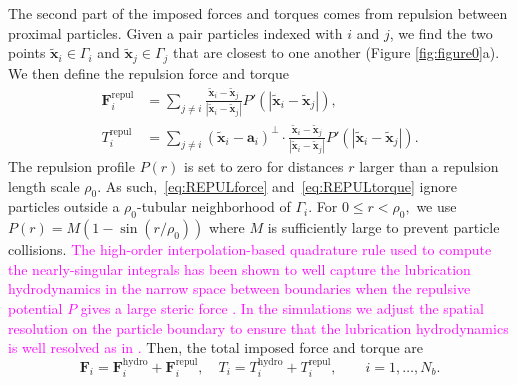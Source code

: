 \documentclass[lineno]{jfm}
\renewcommand{\aa}{\mathbf{a}}
\newcommand{\FF}{\mathbf{F}}
\newcommand{\xx}{\mathbf{x}}
\begin{document}
The second part of the imposed forces and torques comes from repulsion
between proximal particles. Given a pair particles indexed with $i$ and
$j$, we find the two points $\tilde{\xx}_i \in \Gamma_i$ and
$\tilde{\xx}_j \in \Gamma_j$ that are closest to one another (Figure \ref{fig:figure0}a). We then
define the repulsion force and torque
\begin{align}
  \label{eq:REPULforce}
  \FF_i^{\text{repul}} &= \sum_{j \neq i} 
    \frac{\tilde{\xx}_i - \tilde{\xx}_j}
    {|\tilde{\xx}_i - \tilde{\xx}_j|} 
    P'(|\tilde{\xx}_i - \tilde{\xx}_j|), \\
  \label{eq:REPULtorque}
  T_i^{\text{repul}} &= \sum_{j \neq i} 
    (\tilde{\xx}_i - \aa_i)^{\perp} \cdot 
    \frac{\tilde{\xx}_i - \tilde{\xx}_j}
    {|\tilde{\xx}_i - \tilde{\xx}_j|} 
    P'(|\tilde{\xx}_i - \tilde{\xx}_j|).
\end{align}
The repulsion profile $P(r)$ is set to zero for distances $r$ larger than a
repulsion length scale $\rho_0$. As such,~\eqref{eq:REPULforce}
and~\eqref{eq:REPULtorque} ignore particles outside a
$\rho_0$-tubular neighborhood of $\Gamma_i$. For $0 \leq r < \rho_0,$ we use
$P(r) = M(1 - \sin(r/\rho_0))$ where $M$ is sufficiently large to
prevent particle collisions. 
\textcolor{magenta}{
The high-order interpolation-based quadrature rule used to compute the nearly-singular integrals has
been shown to well capture the lubrication hydrodynamics in the narrow space between boundaries 
when the repulsive potential $P$ gives a large steric force \cite{qua-bir2014}.  
In the simulations we adjust the spatial resolution on the particle boundary to ensure that the lubrication hydrodynamics is well resolved as in \cite{qua-vee-you2019,qua-gan-you2021}.
}
%
Then, the total imposed force and torque
are
\begin{equation}
\label{eq:total_forces}
  \FF_i = \FF_i^{\text{hydro}} + \FF_i^{\text{repul}},\quad
  T_i = T_i^{\text{hydro}} + T_i^{\text{repul}}, \qquad
  i=1,\ldots,N_b.
\end{equation}




\end{document}
